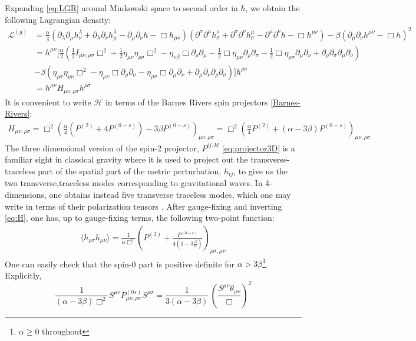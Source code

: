 \documentclass[aps,preprintnumbers,superscriptaddress,longbibliography]{revtex4-1}
\begin{document}
Expanding \eqref{eq:LGR} around Minkowski space to second order in $h$, we obtain the following Lagrangian density:
 \begin{equation}
\begin{split}
\label{eq:Mink}
   \mathcal{L}^{(g)}&= \frac{\alpha}{4}(\partial_{\lambda}\partial_\mu h^{\lambda}_{\nu}+\partial_{\lambda}\partial_\nu h^{\lambda}_{\mu}-\partial_\mu \partial_\nu h-\Box h_{\mu\nu})(\partial^{\sigma}\partial^\mu h_{\sigma}^{\nu}+\partial^{\sigma}\partial^\nu h_{\sigma}^{\mu}-\partial^\mu \partial^\nu h-\Box h^{\mu\nu})-\beta(\partial_{\mu}\partial_{\nu}h^{\mu\nu}-\Box h)^2\\&=h^{\mu\nu}[\frac{\alpha}{2}(\frac{1}{2}I_{\mu\nu,\rho\sigma}\Box^2+\frac{1}{2}\eta_{\mu\nu}\eta_{\rho\sigma}\Box^2-\eta_{\nu\beta}\Box\partial_{\rho}\partial_{\mu}-\frac{1}{2}\Box\eta_{\mu\nu}\partial_{\rho}\partial_{\sigma}-\frac{1}{2}\Box\eta_{\rho\sigma}\partial_{\mu}\partial_{\nu}+\partial_{\rho}\partial_{\sigma}\partial_{\mu}\partial_{\nu})\\&-\beta(\eta_{\rho\sigma}\eta_{\mu\nu}\Box^2-\eta_{\mu\nu}\Box\partial_\rho\partial_\sigma-\eta_{\rho\sigma}\Box\partial_{\mu}\partial_\nu+\partial_{\mu}\partial_{\nu}\partial_{\rho}\partial_\sigma)]h^{\rho\sigma}\\&=h^{\mu\nu}H_{\mu\nu,\rho\sigma}h^{\rho\sigma}
\end{split}
\end{equation}
It is convenient to write $\mathcal{H}$ in terms of the Barnes Rivers spin projectors \eqref{Barnes-Rivers}:
\begin{align}
   \label{eq:H}H_{\mu\nu,\rho\sigma}=\Box^2(\frac{\alpha}{4}(P^{(2)}+4P^{(0-s)})-3\beta P^{(0-s)})_{\mu\nu,\rho\sigma}=\Box^2(\frac{\alpha}{4}P^{(2)}+(\alpha-3\beta)P^{(0-s)})_{\mu\nu,\rho\sigma} 
\end{align}
The three dimensional version of the spin-2 projector, $P^{ij,kl}$ \eqref{eq:projector3D} is a familiar sight in classical gravity where it is used to project out the transverse-traceless part of the spatial part of the metric perturbation, $h_{ij}$, to give us the two transverse,traceless modes corresponding to gravitational waves. In 4-dimensions, one obtains instead five transverse traceless modes, which one may write in terms of their polarization tensors \cite{Spin2}. After gauge-fixing and inverting \eqref{eq:H}, one has, up to gauge-fixing terms, the following two-point function: 
\begin{align}
    \label{eq:Twopointfunction}
 \langle h_{\rho\sigma }h_{\mu\nu}\rangle=\frac{1}{\alpha\Box^2}(P^{(2)}+\frac{P^{(0-s)}}{4(1-3\frac{\beta}{\alpha})})_{\rho\sigma,\mu\nu}
\end{align}
One can easily check that the spin-0 part is positive definite for $\alpha>3\beta$\footnote{$\alpha\geq0$ throughout}. Explicitly,
\begin{equation}
    \frac{1}{(\alpha-3\beta)\Box^2}S^{\mu\nu} P^{(0s)}_{\mu\nu,\rho\sigma}S^{\rho\sigma} = \frac{1}{3(\alpha-3\beta)}\,(\frac{S^{\mu\nu}\theta_{\mu\nu}}{\Box})^2
\end{equation}
\end{document}

